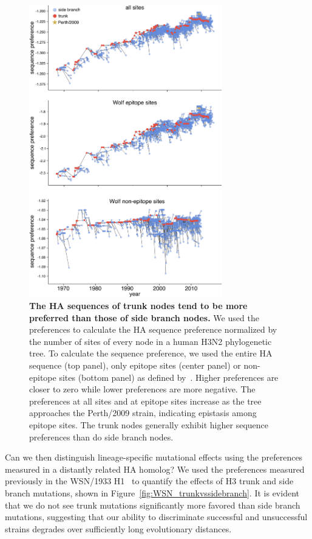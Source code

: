 \documentclass[11pt]{article}
\begin{document}
\begin{figure}
\centerline{\includegraphics[width=0.75\textwidth]{figs/sequence_preference/sequence_preference.pdf}}
\caption{\label{fig:sequence_preference}
{\bf The HA sequences of trunk nodes tend to be more preferred than those of side branch nodes.}
We used the preferences to calculate the HA sequence preference normalized by the number of sites of every node in a human H3N2 phylogenetic tree.
To calculate the sequence preference, we used the entire HA sequence (top panel), only epitope sites (center panel) or non-epitope sites (bottom panel) as defined by~\cite{wolf2006long}.
Higher preferences are closer to zero while lower preferences are more negative.
The preferences at all sites and at epitope sites increase as the tree approaches the Perth/2009 strain, indicating epistasis among epitope sites.
The trunk nodes generally exhibit higher sequence preferences than do side branch nodes.
}
\end{figure}

Can we then distinguish lineage-specific mutational effects using the preferences measured in a distantly related HA homolog?
We used the preferences measured previously in the WSN/1933 H1~\citep{doud2016accurate} to quantify the effects of H3 trunk and side branch mutations, shown in Figure~\ref{fig:WSN_trunkvssidebranch}.
It is evident that we do not see trunk mutations significantly more favored than side branch mutations, suggesting that our ability to discriminate successful and unsuccessful strains degrades over sufficiently long evolutionary distances. 
\end{document}
